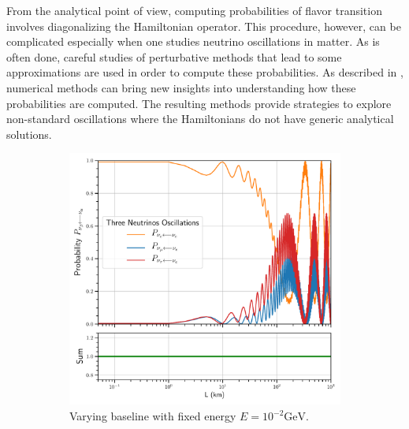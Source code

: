 \documentclass[twocolumn,secnumarabic,amssymb, nobibnotes, aps, prd,10pt]{revtex4-1}
\begin{document}
From the analytical point of view, computing probabilities of flavor transition involves
diagonalizing the Hamiltonian operator. This procedure, however, can be complicated especially
when one studies neutrino oscillations in matter. As is often done, careful studies of
perturbative methods that lead to some approximations are used in order to compute these
probabilities. As described in \cite{Bustamante:2019ggq}, numerical methods can bring new insights 
into understanding how these probabilities are computed. The resulting methods provide strategies
to explore non-standard oscillations where the Hamiltonians do not have generic analytical
solutions. 
\begin{figure}
\captionsetup[subfigure]{aboveskip=-1.5pt,belowskip=-1.5pt} 
\begin{subfigure}{1.05\linewidth}
\includegraphics[width=\linewidth]{Osc3VacuumBaseline.pdf}
\caption{Varying baseline with fixed energy $E=10^{-2} \mathrm{GeV}$.} 
\label{higgs:sspt} 
\end{subfigure} 
\\
\begin{subfigure}{1.05\linewidth}

\end{subfigure}
\end{figure}
\end{document}
